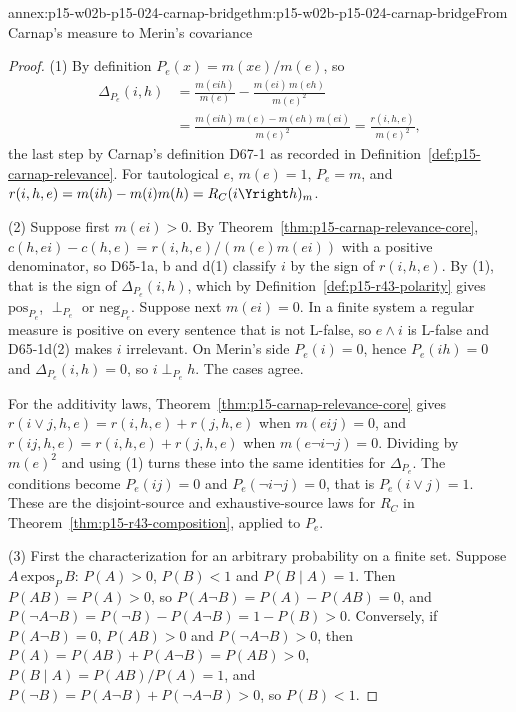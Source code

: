 \begin{annexitem}{annex:p15-w02b-p15-024-carnap-bridge}{thm:p15-w02b-p15-024-carnap-bridge}{From Carnap's measure to Merin's covariance}
\begin{proof}
(1) By definition \(P_e(x)=m(xe)/m(e)\), so
\[
 \begin{aligned}
 \Delta_{P_e}(i,h)&=\frac{m(eih)}{m(e)}-\frac{m(ei)\,m(eh)}{m(e)^2}\\
 &=\frac{m(eih)\,m(e)-m(eh)\,m(ei)}{m(e)^2}
 =\frac{r(i,h,e)}{m(e)^2},
 \end{aligned}
\]
the last step by Carnap's definition D67-1 as recorded in
Definition~\ref{def:p15-carnap-relevance}. For tautological \(e\),
\(m(e)=1\), \(P_e=m\), and \(r(i,h,e)=m(ih)-m(i)m(h)=R_C(i\Yright h)_m\).

(2) Suppose first \(m(ei)>0\). By
Theorem~\ref{thm:p15-carnap-relevance-core},
\(c(h,ei)-c(h,e)=r(i,h,e)/(m(e)m(ei))\) with a positive denominator, so
D65-1a, b and d(1) classify \(i\) by the sign of \(r(i,h,e)\). By (1),
that is the sign of \(\Delta_{P_e}(i,h)\), which by
Definition~\ref{def:p15-r43-polarity} gives \(\mathrm{pos}_{P_e}\),
\(\perp_{P_e}\) or \(\mathrm{neg}_{P_e}\). Suppose next \(m(ei)=0\).
In a finite system a regular measure is positive on every sentence that
is not L-false, so \(e\land i\) is L-false and D65-1d(2) makes \(i\)
irrelevant. On Merin's side \(P_e(i)=0\), hence \(P_e(ih)=0\) and
\(\Delta_{P_e}(i,h)=0\), so \(i\perp_{P_e}h\). The cases agree.

For the additivity laws, Theorem~\ref{thm:p15-carnap-relevance-core}
gives \(r(i\lor j,h,e)=r(i,h,e)+r(j,h,e)\) when \(m(eij)=0\), and
\(r(ij,h,e)=r(i,h,e)+r(j,h,e)\) when \(m(e\neg i\neg j)=0\). Dividing
by \(m(e)^2\) and using (1) turns these into the same identities for
\(\Delta_{P_e}\). The conditions become \(P_e(ij)=0\) and
\(P_e(\neg i\neg j)=0\), that is \(P_e(i\lor j)=1\). These are the
disjoint-source and exhaustive-source laws for \(R_C\) in
Theorem~\ref{thm:p15-r43-composition}, applied to \(P_e\).

(3) First the characterization for an arbitrary probability on a finite
set. Suppose \(A\,\mathrm{expos}_P\,B\): \(P(A)>0\), \(P(B)<1\) and
\(P(B\mid A)=1\). Then \(P(AB)=P(A)>0\), so
\(P(A\neg B)=P(A)-P(AB)=0\), and
\(P(\neg A\neg B)=P(\neg B)-P(A\neg B)=1-P(B)>0\). Conversely, if
\(P(A\neg B)=0\), \(P(AB)>0\) and \(P(\neg A\neg B)>0\), then
\(P(A)=P(AB)+P(A\neg B)=P(AB)>0\), \(P(B\mid A)=P(AB)/P(A)=1\), and
\(P(\neg B)=P(A\neg B)+P(\neg A\neg B)>0\), so \(P(B)<1\).


\end{proof}
\end{annexitem}
